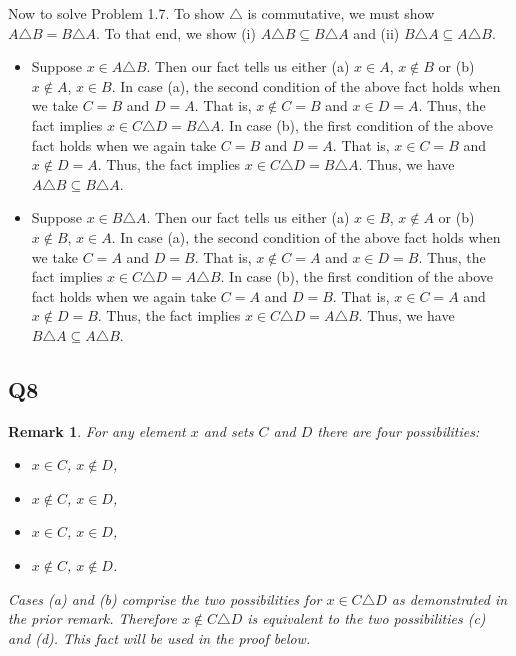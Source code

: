 \documentclass[12pt]{article}
\newtheorem{remark}{Remark}
\numberwithin{theorem}{section}
\numberwithin{equation}{section}
\numberwithin{remark}{section}
\numberwithin{definition}{section}
\numberwithin{theorem}{section}
\numberwithin{lemma}{section}
\numberwithin{example}{section}
\begin{document}
Now to solve Problem 1.7. To show $\triangle$ is commutative, we must show $A \triangle B = B \triangle A$. To that end, we show (i) $A \triangle B \subseteq B \triangle A$ and (ii) $B \triangle A \subseteq A \triangle B$.
\begin{itemize}
	\item[(i)]{Suppose $x\in A\triangle B$. Then our fact tells us either (a) $x\in A$, $x\notin B$ or (b) $x\notin A$, $x \in B$. In case (a), the second condition of the above fact holds when we take $C = B$ and $D = A$. That is, $x \notin C = B$ and $x \in D = A$. Thus, the fact implies $x \in C \triangle  D = B \triangle A$. In case (b), the first condition of the above fact holds when we again take $C = B$ and $D = A$. That is, $x \in C = B$ and $x \notin D = A$. Thus, the fact implies $x \in C \triangle D = B \triangle A$. Thus, we have $A \triangle B \subseteq B \triangle A$.}
	\item[(ii)]{Suppose $x\in B\triangle A$. Then our fact tells us either (a) $x\in B$, $x\notin A$ or (b) $x\notin B$, $x \in A$. In case (a), the second condition of the above fact holds when we take $C = A$ and $D = B$. That is, $x \notin C = A$ and $x \in D = B$. Thus, the fact implies $x \in C \triangle  D = A \triangle B$. In case (b), the first condition of the above fact holds when we again take $C = A$ and $D = B$. That is, $x \in C = A$ and $x \notin D = B$. Thus, the fact implies $x \in C \triangle D = A \triangle B$. Thus, we have $B \triangle A \subseteq A \triangle B$.}
\end{itemize}

\subsection{Q8}

\begin{remark}
	For any element $x$ and sets $C$ and $D$ there are four possibilities:
	\begin{itemize}
		\item[(a)]{$x\in C$, $x\notin D$,}
		\item[(b)]{$x\notin C$, $x\in D$,}
		\item[(c)]{$x\in C$, $x\in D$,}
		\item[(d)]{$x\notin C$, $x\notin D$.}
	\end{itemize}
	Cases (a) and (b) comprise the two possibilities for $x\in C\triangle D$ as demonstrated in the prior remark. Therefore $x\notin C\triangle D$ is equivalent to the two possibilities (c) and (d). This fact will be used in the proof below. 
\end{remark}
\end{document}
